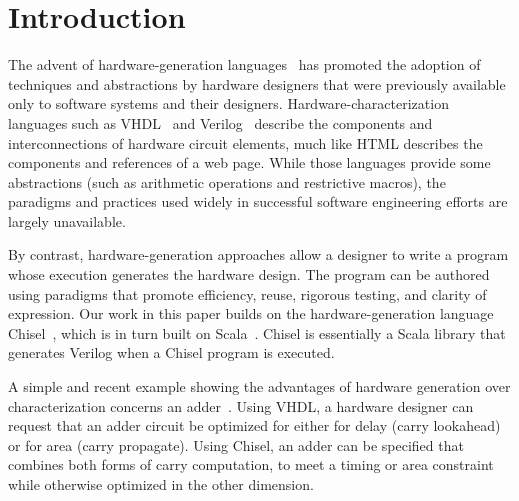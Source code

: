 \documentclass[sigplan,anonymous,review]{acmart}
\begin{document}

\maketitle

\section{Introduction}

The advent of hardware-generation languages~\cite{chisel:article} has promoted the adoption of techniques and abstractions by hardware designers that were previously available only to software systems and their designers. Hardware-characterization languages such as VHDL~\cite{vhdl} and Verilog~\cite{verilog} describe the components and interconnections of hardware circuit elements, much like HTML describes the components and references of a web page. While those languages provide some abstractions (such as arithmetic operations and restrictive macros), the paradigms and practices used widely in successful software engineering efforts are largely unavailable.

By contrast, hardware-generation approaches allow a designer to write a program whose execution generates the hardware design. The program can be authored using para\-digms that promote efficiency, reuse, rigorous testing, and clarity of expression. Our work in this paper builds on the hardware-generation language Chisel~\cite{chisel:book}, which is in turn built on Scala~\cite{scala-overview-tech-report}. Chisel is essentially a Scala library that generates Verilog when a Chisel program is executed.

A simple and recent example showing the advantages of hardware generation over characterization concerns an adder~\cite{Deters:adder}. Using VHDL, a hardware designer can request that an adder circuit be optimized for either for delay (carry lookahead) or for area (carry propagate). Using Chisel, an adder can be specified that combines both forms of carry computation, to meet a timing or area constraint while otherwise optimized in the other dimension.
\end{document}
